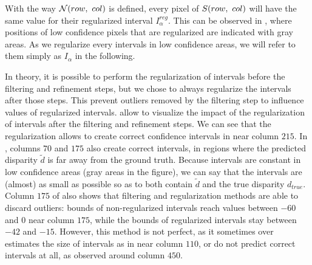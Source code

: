 With the way $\mathcal{N}(row, ~col)$ is defined, every pixel of $S(row, ~col)$ will have the same value for their regularized interval $I^{reg}_\alpha$. This can be observed in , where positions of low confidence pixels that are regularized are indicated with gray areas. As we regularize every intervals in low confidence areas, we will refer to them simply as $I_\alpha$ in the following.

In theory, it is possible to perform the regularization of intervals before the filtering and refinement steps, but we chose to always regularize the intervals after those steps. This prevent outliers removed by the filtering step to influence values of regularized intervals.  allow to visualize the impact of the regularization of intervals after the filtering and refinement steps. We can see that the regularization allows to create correct confidence intervals in  near column $215$. In , columns $70$ and $175$ also create correct intervals, in regions where the predicted disparity $\tilde{d}$ is far away from the ground truth. Because intervals are constant in low confidence areas (gray areas in the figure), we can say that the intervals are (almost) as small as possible so as to both contain $\tilde{d}$ and the true disparity $d_{true}$. Column $175$ of  also shows that filtering and regularization methods are able to discard outliers: bounds of non-regularized intervals reach values between $-60$ and $0$ near column $175$, while the bounds of regularized intervals stay between $-42$ and $-15$. However, this method is not perfect, as it sometimes over estimates the size of intervals as in  near column $110$, or do not predict correct intervals at all, as observed around column $450$.

